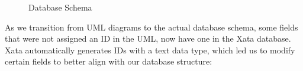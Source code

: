 \FloatBarrier
\begin{figure}[ht]\ContinuedFloat
    \centering
    \caption{Database Schema}
\end{figure}
\FloatBarrier

\vspace{5mm}

\noindent As we transition from UML diagrams to the actual database schema, some fields that were not assigned an ID in the UML, now have one in the Xata database. Xata automatically generates IDs with a text data type, which led us to modify certain fields to better align with our database structure:

